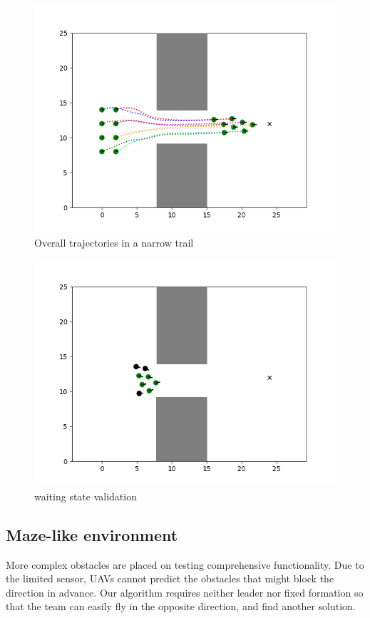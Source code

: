 \begin{figure}[H]
    \centering
    \includegraphics[scale=1]{figures/trail_overall.png}
    \caption{Overall trajectories in a narrow trail}
    \label{fig:fig_label}
\end{figure}
\begin{figure}[H]
    \centering
    \includegraphics[scale=1]{figures/trail_enter.png}
    \caption{waiting state validation}
    \label{fig:fig_label}
\end{figure}

\subsection{Maze-like environment}
More complex obstacles are placed on testing comprehensive functionality. Due to the limited sensor, UAVs cannot predict the obstacles that might block the direction in advance. Our algorithm requires neither leader nor fixed formation so that the team can easily fly in the opposite direction, and find another solution. 

